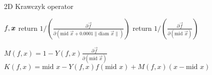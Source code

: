 \documentclass{article}
\begin{document}
\begin{algorithm}
\caption{2D Krawczyk operator}
\label{alg:K2D}
\begin{algorithmic}
 {$f, \textbf{\emph{x}}$}
\State       return $1/(\frac{\partial \overrightarrow{f}}{\partial (\text{mid } \overrightarrow{x} + 0.0001 \| \text{diam } \overrightarrow{x} \| )})$
\Else
\State       return $1/(\frac{\partial \overrightarrow{f}}{\partial (\text{mid } \overrightarrow{x} )})$
\EndIf
\EndFunction

\State $M(f, x) = 1 - Y(f, x) \frac{\partial \overrightarrow{f}}{\partial (\text{mid } \overrightarrow{x} )} $
\State $K(f, x) = \text{mid } x - Y(f,x) f(\text{mid } x) + M(f,x) (x - \text{mid } x) $

\end{algorithmic}
\end{algorithm}
\end{document}
